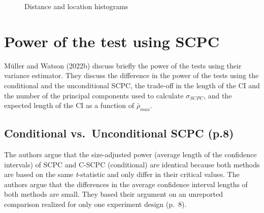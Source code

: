 \documentclass[
]{article}
\begin{document}
\begin{figure}

\begin{minipage}[t]{0.50\linewidth}

{\centering 


}

\end{minipage}%
%
\begin{minipage}[t]{0.50\linewidth}

{\centering 


}

\end{minipage}%

\caption{\label{fig-extras}Distance and location histograms}

\end{figure}

\hypertarget{power-of-the-test-using-scpc}{%
\section{Power of the test using
SCPC}\label{power-of-the-test-using-scpc}}

Müller and Watson (2022b) discuss briefly the power of the tests using
their variance estimator. They discuss the difference in the power of
the tests using the conditional and the unconditional SCPC, the
trade-off in the length of the CI and the number of the principal
components used to calculate \(\sigma_{SCPC}\), and the expected length
of the CI as a function of \(\bar\rho_{max}\).

\hypertarget{conditional-vs.-unconditional-scpc-p.8}{%
\subsection{Conditional vs.~Unconditional SCPC
(p.8)}\label{conditional-vs.-unconditional-scpc-p.8}}

The authors argue that the size-adjusted power (average length of the
confidence intervals) of SCPC and C-SCPC (conditional) are identical
because both methods are based on the same \emph{t}-statistic and only
differ in their critical values. The authors argue that the differences
in the average confidence interval lengths of both methods are small.
They based their argument on an unreported comparison realized for only
one experiment design (p.~8).
\end{document}
